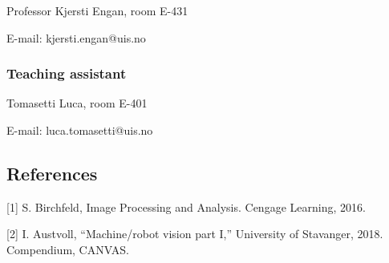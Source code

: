 \documentclass[border=1in]{standalone}
\begin{document}
\begin{minipage}{21cm}
Professor Kjersti Engan, room E-431

E-mail: kjersti.engan@uis.no

\hypertarget{teaching-assistant}{%
\subsubsection{Teaching assistant}\label{teaching-assistant}}

Tomasetti Luca, room E-401

E-mail: luca.tomasetti@uis.no

    \hypertarget{references}{%
\subsection{References}\label{references}}

{[}1{]} S. Birchfeld, Image Processing and Analysis. Cengage Learning,
2016.

{[}2{]} I. Austvoll, ``Machine/robot vision part I,'' University of
Stavanger, 2018. Compendium, CANVAS.


    
    
    \end{minipage}    
\end{document}
